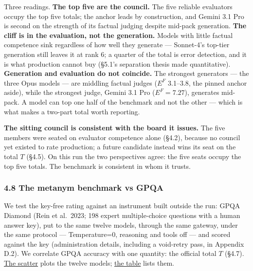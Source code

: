 Three readings. \textbf{The top five are the council.} The five reliable evaluators occupy the top five totals; the anchor leads by construction, and Gemini 3.1 Pro is second on the strength of its factual judging despite mid-pack generation. \textbf{The cliff is in the evaluation, not the generation.} Models with little factual competence sink regardless of how well they generate --- Sonnet-4's top-tier generation still leaves it at rank 6; a quarter of the total is error detection, and it is what production cannot buy (§5.1's separation thesis made quantitative). \textbf{Generation and evaluation do not coincide.} The strongest generators --- the three Opus models --- are middling factual judges (\(E^{F}\) 3.1--3.8, the pinned anchor aside), while the strongest judge, Gemini 3.1 Pro (\(E^{F}=7.27\)), generates mid-pack. A model can top one half of the benchmark and not the other --- which is what makes a two-part total worth reporting.

\textbf{The sitting council is consistent with the board it issues.} The five members were seated on evaluator competence alone (§4.2), because no council yet existed to rate production; a future candidate instead wins its seat on the total \(T\) (§4.5). On this run the two perspectives agree: the five seats occupy the top five totals. The benchmark is consistent in whom it trusts.

\subsubsection{4.8 The metanym benchmark vs GPQA}\label{the-metanym-benchmark-vs-gpqa}

We test the key-free rating against an instrument built outside the run: GPQA Diamond (Rein et al.~2023; 198 expert multiple-choice questions with a human answer key), put to the same twelve models, through the same gateway, under the same protocol --- Temperature=0, reasoning and tools off --- and scored against the key (administration details, including a void-retry pass, in Appendix D.2). We correlate GPQA accuracy with one quantity: the official total \(T\) (§4.7). \hyperref[fig-gpqa-scatter]{The scatter} plots the twelve models; \hyperref[tab-gpqa-values]{the table} lists them.

\protect{}\label{fig-gpqa-scatter}{}

